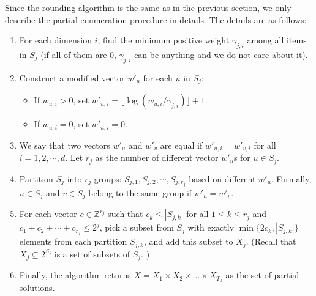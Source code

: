 \documentclass[11pt,a4paper]{article} \usepackage{enumitem}
\theoremstyle{definition}
\begin{document}
Since the rounding algorithm is the same as in the previous section, 
we only describe the partial enumeration procedure in details. 
The details are as follows:

\begin{enumerate}
\item For each dimension \(i\), find the minimum positive weight \(\gamma_{j,i}\) among all items in \(S_j\) (if all of them are 0, \(\gamma_{j,i}\) can be anything and we do not care about it).

\item Construct a modified vector \(w'_u\) for each \(u\) in \(S_j\):
\begin{itemize}
    \item If \(w_{u,i} > 0\), set \(w'_{u,i} = \lfloor \log(w_{u,i}/\gamma_{j,i}) \rfloor + 1\).
    \item If \(w_{u,i} = 0\), set \(w'_{u,i} = 0\).
\end{itemize}

\item We say that two vectors \(w'_u\) and \(w'_v\) are equal if 
\(w'_{u,i} = w'_{v,i}\) for all \(i = 1, 2, \cdots, d\). 
Let \(r_j\) as the number of different vector \(w'_u\)s for $u\in S_j$.

\item Partition \(S_j\) into \(r_j\) groups: \(S_{j,1}, S_{j,2}, \cdots, S_{j,r_j}\) based on different \(w'_u\). Formally, 
$u\in S_j$ and $v\in S_j$ belong to the same group
if $w'_u = w'_v$.


\item For each vector \(c \in \mathbb{Z}^{r_j}\) such that \(c_k \le |S_{j,k}|\) for all \(1 \le k \le r_j\) and $c_1+c_2+\cdots+c_{r_j}\leq 2^j$, pick a subset from \(S_j\) with exactly \(\min \{2c_k, |S_{j,k}|\}\) elements from each partition \(S_{j,k}\), and add this subset to \(X_j\). (Recall that $X_j\subseteq 2^{S_j}$ is a set of subsets of $S_j$. )

\item Finally, the algorithm returns $X=X_1\times X_2\times \ldots\times X_{T_0}$ as the set of partial solutions.
\end{enumerate}
\end{document}
